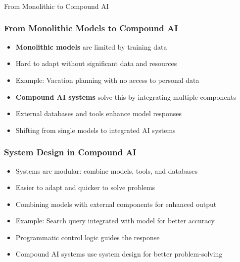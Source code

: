 \begin{frame}[fragile]\frametitle{}
\begin{center}
{\Large From Monolithic to Compound AI}
\end{center}
\end{frame}

\begin{frame}[fragile]\frametitle{From Monolithic Models to Compound AI}
\begin{itemize}
    \item \textbf{Monolithic models} are limited by training data
    \item Hard to adapt without significant data and resources
    \item Example: Vacation planning with no access to personal data
    \item \textbf{Compound AI systems} solve this by integrating multiple components
    \item External databases and tools enhance model responses
    \item Shifting from single models to integrated AI systems
\end{itemize}
\end{frame}

\begin{frame}[fragile]\frametitle{System Design in Compound AI}
\begin{itemize}
    \item Systems are modular: combine models, tools, and databases
    \item Easier to adapt and quicker to solve problems
    \item Combining models with external components for enhanced output
    \item Example: Search query integrated with model for better accuracy
    \item Programmatic control logic guides the response
    \item Compound AI systems use system design for better problem-solving
\end{itemize}
\end{frame}

